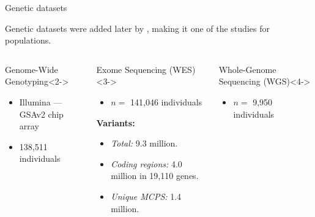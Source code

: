 \begin{frame}{Genetic datasets}

    Genetic datasets were added later by \textcite{ziyatdinov2023}, making it one of the  studies for  populations.

    {\footnotesize
    \begin{columns}[t]

        \begin{column}{0.3\textwidth}
            \begin{block}{Genome-Wide Genotyping}<2->
                \begin{itemize}
                    \item Illumina --- GSAv2 chip array
                    \item 138,511 individuals
                \end{itemize}
            \end{block}
        \end{column}

        \begin{column}{0.3\textwidth}
            \begin{block}{Exome Sequencing (WES)}<3->
                \begin{itemize}
                    \item $n =$ 141,046 individuals
                \end{itemize}

                \textbf{Variants:}
                \begin{itemize}
                    \item \textit{Total:} 9.3 million.
                    \item \textit{Coding regions:} 4.0 million in 19,110 genes.
                    \item \textit{Unique MCPS:} 1.4 million.
                \end{itemize}

            \end{block}        
        \end{column}

        \begin{column}{0.3\textwidth}
            \begin{block}{Whole-Genome Sequencing (WGS)}<4->
                \begin{itemize}
                    \item $n =$ 9,950 individuals
                \end{itemize}


\end{block}
\end{column}
\end{columns}}
\end{frame}
